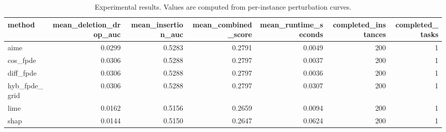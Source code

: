 \begin{table}[t]
\caption{Experimental results. Values are computed from per-instance perturbation curves.}
\label{tab:main_results_computed}
\centering
\begin{tabular}{lrrrrrr}
\toprule
method & mean\_deletion\_drop\_auc & mean\_insertion\_auc & mean\_combined\_score & mean\_runtime\_seconds & completed\_instances & completed\_tasks \\
\midrule
aime & 0.0299 & 0.5283 & 0.2791 & 0.0049 & 200 & 1 \\
cos\_fpde & 0.0306 & 0.5288 & 0.2797 & 0.0037 & 200 & 1 \\
diff\_fpde & 0.0306 & 0.5288 & 0.2797 & 0.0036 & 200 & 1 \\
hyb\_fpde\_grid & 0.0306 & 0.5288 & 0.2797 & 0.0307 & 200 & 1 \\
lime & 0.0162 & 0.5156 & 0.2659 & 0.0094 & 200 & 1 \\
shap & 0.0144 & 0.5150 & 0.2647 & 0.0624 & 200 & 1 \\
\bottomrule
\end{tabular}

\end{table}

